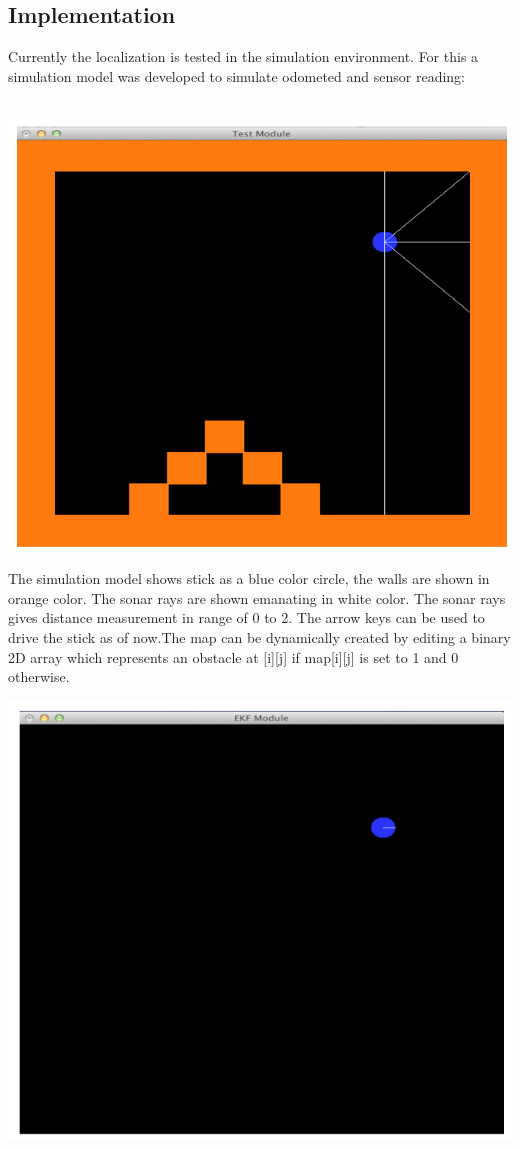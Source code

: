 \documentclass[12pt]{article}
\begin{document}
\subsection{Implementation}
Currently the localization is tested in the simulation environment.
For this a simulation model was developed to simulate odometed and sensor reading:
\\
\\
\begin{center} \includegraphics[scale=0.4]{p5} \end{center}

The simulation model shows stick as a blue color circle, the walls are shown in orange color. The sonar rays are shown emanating in white color. The sonar rays gives distance measurement in range of 0 to 2. The arrow keys can be used to drive the stick as of now.The map can be dynamically created by editing a binary 2D array which represents an obstacle at [i][j] if map[i][j] is set to 1 and 0 otherwise\cite{glut}.
\begin{center} \includegraphics[scale=0.4]{p6} \end{center}
\end{document}
